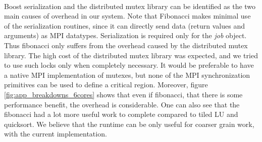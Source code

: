 \paragraph{}
Boost serialization and the distributed mutex library can be identified as the two main causes of overhead in our system.    
Note that Fibonacci makes minimal use of the serialization routines, since it can directly send data (return values and 
arguments) as MPI datatypes.  Serialization is required only for the \emph{job} object.  Thus fibonacci only suffers from
the overhead caused by the distributed mutex library.  The high cost of the distributed mutex library was expected, and we
tried to use such locks only when completely necessary.  It would be preferable to have a native MPI implementation of 
mutexes, but none of the MPI synchronization primitives can be used to define a critical region.  Moreover, figure 
\ref{fig:app_breakdowns_6cores} shows that even if fibonacci, that there is some performance benefit, the overhead is
considerable.  One can also see that the fibonacci had a lot more useful work to complete compared to tiled LU and 
quicksort.  We believe that the runtime can be only useful for coarser grain work, with the current implementation.



